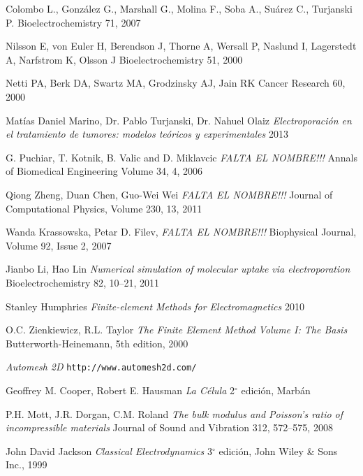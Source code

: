 \backmatter


\begin{thebibliography}{99}


	Colombo L., González G., Marshall G., Molina F., Soba A., Suárez C., Turjanski P.
	Bioelectrochemistry 71,
	2007

	Nilsson E, von Euler H, Berendson J, Thorne A, Wersall P, Naslund I, Lagerstedt A, Narfstrom K, Olsson J
	Bioelectrochemistry 51,
	2000

	Netti PA, Berk DA, Swartz MA, Grodzinsky AJ, Jain RK
	Cancer Research 60,
	2000

	Matías Daniel Marino, Dr. Pablo Turjanski, Dr. Nahuel Olaiz
	\emph{Electroporación en el tratamiento de tumores: modelos teóricos y experimentales}
	2013

	G. Puchiar, T. Kotnik, B. Valic and D. Miklavcic
	\emph{FALTA EL NOMBRE!!!}
	Annals of Biomedical Engineering
	Volume 34, 4, 2006

	Qiong Zheng, Duan Chen, Guo-Wei Wei
	\emph{FALTA EL NOMBRE!!!}
	Journal of Computational Physics,	
	Volume 230, 13, 2011

	Wanda Krassowska, Petar D. Filev,
	\emph{FALTA EL NOMBRE!!!}
	Biophysical Journal, Volume 92, Issue 2, 2007

	Jianbo Li, Hao Lin
	\emph{Numerical simulation of molecular uptake via electroporation}
	Bioelectrochemistry 82, 10–21, 2011 

	Stanley Humphries
	\emph{Finite-element Methods for Electromagnetics}
	2010

	O.C. Zienkiewicz, R.L. Taylor
	\emph{The Finite Element Method Volume I: The Basis}
	Butterworth-Heinemann, 5th edition, 2000

	\emph{Automesh 2D}
	\texttt{http://www.automesh2d.com/}

	Geoffrey M. Cooper, Robert E. Hausman
	\emph{La Célula}
	2$^{\circ}$ edición, 
	Marbán

	P.H. Mott, J.R. Dorgan, C.M. Roland 
	\emph{The bulk modulus and Poisson's ratio of incompressible materials} 
	Journal of Sound and Vibration 312, 572–575, 2008
	
	John David Jackson
	\emph{Classical Electrodynamics}
	3$^{\circ}$ edición,
	John Wiley \& Sons Inc.,
	1999


\end{thebibliography}
